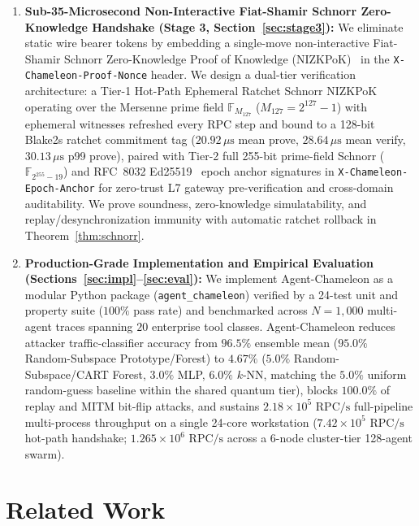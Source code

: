 \documentclass[conference,10pt]{IEEEtran}
\begin{document}
\begin{enumerate}
    \item \textbf{Sub-35-Microsecond Non-Interactive Fiat-Shamir Schnorr Zero-Knowledge Handshake (Stage 3, Section~\ref{sec:stage3}):} We eliminate static wire bearer tokens by embedding a single-move non-interactive Fiat-Shamir Schnorr Zero-Knowledge Proof of Knowledge (NIZKPoK)~\cite{fiat1986how, schnorr1991efficient, bellare1993random} in the \texttt{X-Chameleon-Proof-Nonce} header. We design a dual-tier verification architecture: a Tier-1 Hot-Path Ephemeral Ratchet Schnorr NIZKPoK operating over the Mersenne prime field $\mathbb{F}_{M_{127}}$ ($M_{127} = 2^{127}-1$) with ephemeral witnesses refreshed every RPC step and bound to a 128-bit Blake2s ratchet commitment tag ($20.92\,\mu\text{s}$ mean prove, $28.64\,\mu\text{s}$ mean verify, $30.13\,\mu\text{s}$ p99 prove), paired with Tier-2 full 255-bit prime-field Schnorr ($\mathbb{F}_{2^{255}-19}$) and RFC~8032 Ed25519~\cite{josefsson2017eddsa} epoch anchor signatures in \texttt{X-Chameleon-Epoch-Anchor} for zero-trust L7 gateway pre-verification and cross-domain auditability. We prove soundness, zero-knowledge simulatability, and replay/desynchronization immunity with automatic ratchet rollback in Theorem~\ref{thm:schnorr}.
    \item \textbf{Production-Grade Implementation and Empirical Evaluation (Sections~\ref{sec:impl}--\ref{sec:eval}):} We implement Agent-Chameleon as a modular Python package (\texttt{agent\_chameleon}) verified by a 24-test unit and property suite ($100\%$ pass rate) and benchmarked across $N = 1{,}000$ multi-agent traces spanning $20$ enterprise tool classes. Agent-Chameleon reduces attacker traffic-classifier accuracy from $96.5\%$ ensemble mean ($95.0\%$ Random-Subspace Prototype/Forest) to $4.67\%$ ($5.0\%$ Random-Subspace/CART Forest, $3.0\%$ MLP, $6.0\%$ $k$-NN, matching the $5.0\%$ uniform random-guess baseline within the shared quantum tier), blocks $100.0\%$ of replay and MITM bit-flip attacks, and sustains $2.18 \times 10^5\text{ RPC/s}$ full-pipeline multi-process throughput on a single 24-core workstation ($7.42 \times 10^5\text{ RPC/s}$ hot-path handshake; $1.265 \times 10^6\text{ RPC/s}$ across a 6-node cluster-tier 128-agent swarm).
\end{enumerate}

\section{Related Work}
\label{sec:related}
\end{document}
